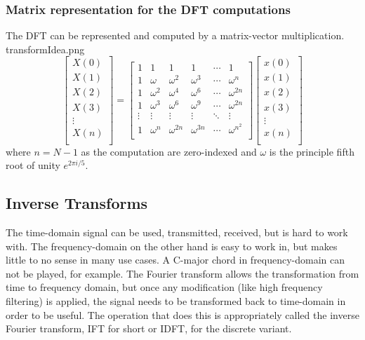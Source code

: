 \subsubsection{Matrix representation for the DFT computations} 
The DFT can be represented and computed by a matrix-vector multiplication. 
transformIdea.png
$$
\begin{bmatrix}
    X(0) \\
    X(1) \\
    X(2) \\
    X(3) \\
    \vdots\\
    X(n) \\
\end{bmatrix}
=
\begin{bmatrix}
    1 & 1 & 1 & 1 & \cdots & 1\\
    1 & \omega & \omega ^2 & \omega ^3 & \cdots & \omega ^n\\
    1 & \omega ^2 & \omega ^4 & \omega ^6 & \cdots & \omega ^{2n}\\
    1 & \omega ^3 & \omega ^6 & \omega ^9 & \cdots & \omega ^{2n}\\
    \vdots & \vdots & \vdots & \vdots & \ddots & \vdots \\
    1 & \omega ^{n} & \omega ^{2n} & \omega ^{3n} & \cdots & \omega ^{{n^2}}\\
\end{bmatrix}
\begin{bmatrix}
    x(0) \\
    x(1) \\
    x(2) \\
    x(3) \\
    \vdots\\
    x(n) \\
\end{bmatrix}
$$
where $n = N-1$ as the computation are zero-indexed and $\omega$ is the principle fifth root of unity $e^{2\pi i/5} $. 


\subsection{Inverse Transforms}
The time-domain signal can be used, transmitted, received, but is hard to work with. The frequency-domain on the other hand is easy to work in, but makes little to no sense in many use cases. A C-major chord in frequency-domain can not be played, for example. The Fourier transform allows the transformation from time to frequency domain, but once any modification (like high frequency filtering) is applied, the signal needs to be transformed back to time-domain in order to be useful. The operation that does this is appropriately called the inverse Fourier transform, IFT for short or IDFT, for the discrete variant.


